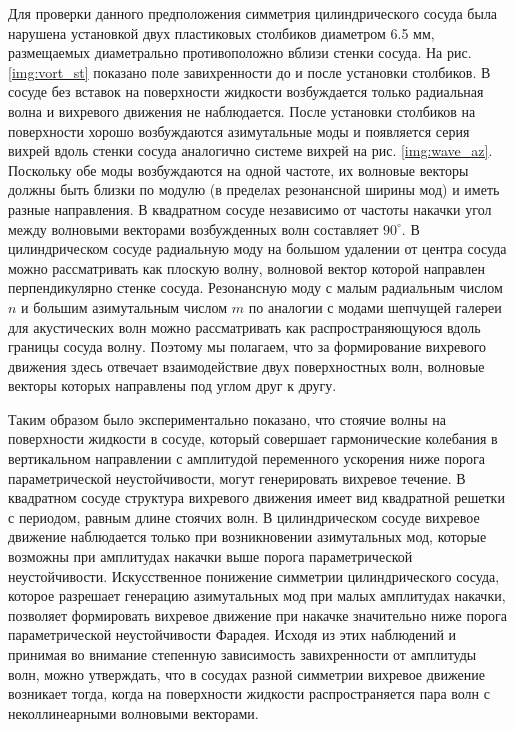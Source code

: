 Для проверки данного предположения симметрия цилиндрического сосуда была нарушена установкой двух пластиковых столбиков диаметром 6.5 мм, размещаемых диаметрально противоположно вблизи стенки сосуда. На рис. \ref{img:vort_st} показано поле завихренности до и после установки столбиков. В сосуде без вставок на поверхности жидкости возбуждается только радиальная волна и вихревого движения не наблюдается. После установки столбиков на поверхности хорошо возбуждаются азимутальные моды и появляется серия вихрей вдоль стенки сосуда аналогично системе вихрей на рис. \ref{img:wave_az}. Поскольку обе моды возбуждаются на одной частоте, их волновые векторы должны быть близки по модулю (в пределах резонансной ширины мод) и иметь разные направления. В квадратном сосуде независимо от частоты накачки угол между волновыми векторами возбужденных волн составляет $90^\circ$. В цилиндрическом сосуде радиальную моду на большом удалении от центра сосуда можно рассматривать как плоскую волну, волновой вектор которой направлен перпендикулярно стенке сосуда. Резонансную моду с малым радиальным числом $n$ и большим азимутальным числом $m$ по аналогии с модами шепчущей галереи для акустических волн можно рассматривать как распространяющуюся вдоль границы сосуда волну. Поэтому мы полагаем, что за формирование вихревого движения здесь отвечает взаимодействие двух поверхностных волн, волновые векторы которых направлены под углом друг к другу.

Таким образом было экспериментально показано, что стоячие волны на поверхности жидкости в сосуде, который совершает гармонические колебания в вертикальном направлении с амплитудой переменного ускорения ниже порога параметрической неустойчивости, могут генерировать вихревое течение. В квадратном сосуде структура вихревого движения имеет вид квадратной решетки с периодом, равным длине стоячих волн. В цилиндрическом сосуде вихревое движение наблюдается только при возникновении азимутальных мод, которые возможны при амплитудах накачки выше порога параметрической неустойчивости. Искусственное понижение симметрии цилиндрического сосуда, которое разрешает генерацию азимутальных мод при малых амплитудах накачки, позволяет формировать вихревое движение при накачке значительно ниже порога параметрической неустойчивости Фарадея. Исходя из этих наблюдений и принимая во внимание степенную зависимость завихренности от амплитуды волн, можно утверждать, что в сосудах разной симметрии вихревое движение возникает тогда, когда на поверхности жидкости распространяется пара волн с неколлинеарными волновыми векторами.


